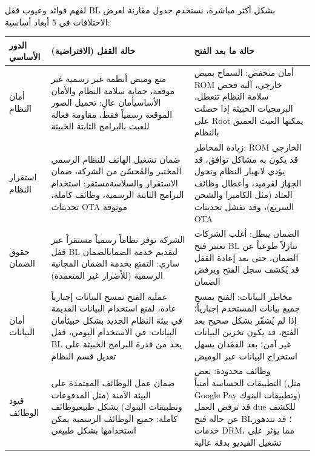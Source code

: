 لفهم فوائد وعيوب قفل BL بشكل أكثر مباشرة، نستخدم جدول مقارنة لعرض الاختلافات في 5 أبعاد أساسية:

\begin{center}
\begin{tabularx}{\linewidth}{|X|X|X|}
\hline
\textbf{الدور الأساسي} & \textbf{حالة القفل (الافتراضية)} & \textbf{حالة ما بعد الفتح} \tabularnewline
\hline
أمان النظام & منع وميض أنظمة غير رسمية غير موقعة، حماية سلامة النظام والأمان الأساسي\newline أمان عالٍ: تحميل الصور الموقعة رسمياً فقط، مقاومة فعالة للعبث بالبرامج الثابتة الخبيثة & أمان منخفض: السماح بميض ROM خارجي، آلية فحص سلامة النظام تتعطل، البرمجيات الخبيثة إذا حصلت على Root يمكنها العبث العميق بالنظام \tabularnewline
استقرار النظام & ضمان تشغيل الهاتف للنظام الرسمي المختبر والمُحسّن من الشركة، ضمان الاستقرار والسلاسة\newline مستقر: استخدام البرامج الثابتة الرسمية، وظائف كاملة، تحديثات OTA موثوقة & زيادة المخاطر: ROM الخارجي قد يكون به مشاكل توافق، قد يؤدي لانهيار النظام وتحول الجهاز لقرميد، وأعطال وظائف العتاد (مثل الكاميرا والشحن السريع)، وقد تفشل تحديثات OTA \tabularnewline
حقوق الضمان & الشركة توفر نظاماً رسمياً مستقراً عبر قفل BL لتقديم خدمة الضمان\newline الضمان ساري: التمتع بخدمة الضمان المجانية الرسمية (للأضرار غير المتعمدة) & الضمان يبطل: أغلب الشركات تعتبر فتح BL تنازلاً طوعياً عن الضمان، حتى بعد إعادة القفل قد يُكشف سجل الفتح ويرفض الضمان \tabularnewline
أمان البيانات & عملية الفتح تمسح البيانات إجبارياً عادة، لمنع استخدام البيانات القديمة في بيئة النظام الجديد بشكل خبيث\newline أمان البيانات: في الاستخدام اليومي، قفل BL يحد من قدرة البرامج الخبيثة على تعديل قسم النظام & مخاطر البيانات: الفتح يمسح جميع بيانات المستخدم إجبارياً؛ إذا لم يُشفّر بشكل صحيح بعد الفتح، قد يكون تخزين البيانات غير آمن؛ بعد الفقدان يسهل استخراج البيانات عبر الوميض \tabularnewline
قيود الوظائف & ضمان عمل الوظائف المعتمدة على البيئة الآمنة (مثل المدفوعات وتطبيقات البنوك) بشكل طبيعي\newline وظائف كاملة: جميع الوظائف الرسمية يمكن استخدامها بشكل طبيعي & وظائف محدودة: بعض التطبيقات الحساسة أمنياً (مثل Google Pay وتطبيقات البنوك) قد ترفض العمل due للكشف عن حالة فتح BL؛ قد تتدهور خدمات DRM، مما يؤثر على تشغيل الفيديو بدقة عالية \tabularnewline
\hline
\end{tabularx}
\end{center}


